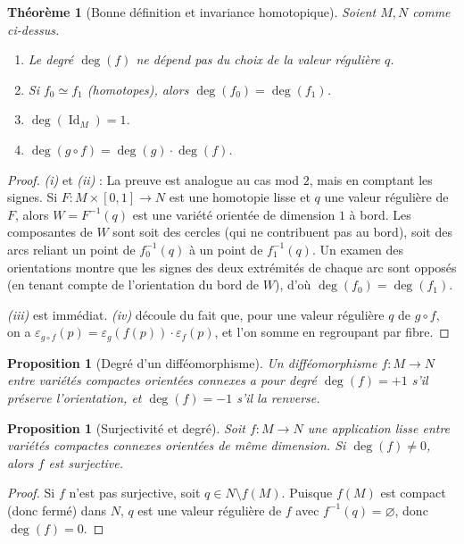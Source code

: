 \documentclass[12pt,a4paper,openany]{book}
\theoremstyle{definition}
\theoremstyle{plain}
\newtheorem{theoreme}[definition]{Théorème}
\newtheorem{proposition}[definition]{Proposition}
\theoremstyle{remark}
\DeclareMathOperator{\Id}{Id}
\begin{document}
\begin{theoreme}[Bonne définition et invariance homotopique]\label{thm:degre-oriente-bdef}
Soient $M, N$ comme ci-dessus.
\begin{enumerate}[label=(\roman*)]
  \item Le degré $\deg(f)$ ne dépend pas du choix de la valeur régulière $q$.
  \item Si $f_0 \simeq f_1$ (homotopes), alors $\deg(f_0) = \deg(f_1)$.
  \item $\deg(\Id_M) = 1$.
  \item $\deg(g \circ f) = \deg(g) \cdot \deg(f)$.
\end{enumerate}
\end{theoreme}

\begin{proof}
\textit{(i)} et \textit{(ii)} : La preuve est analogue au cas mod $2$, mais en
comptant les signes. Si $F : M \times [0,1] \to N$ est une homotopie lisse et
$q$ une valeur régulière de $F$, alors $W = F^{-1}(q)$ est une variété orientée
de dimension $1$ à bord. Les composantes de $W$ sont soit des cercles (qui ne
contribuent pas au bord), soit des arcs reliant un point de $f_0^{-1}(q)$ à un
point de $f_1^{-1}(q)$. Un examen des orientations montre que les signes des
deux extrémités de chaque arc sont opposés (en tenant compte de l'orientation du
bord de $W$), d'où $\deg(f_0) = \deg(f_1)$.

\textit{(iii)} est immédiat. \textit{(iv)} découle du fait que, pour une valeur
régulière $q$ de $g \circ f$, on a
$\varepsilon_{g \circ f}(p) = \varepsilon_g(f(p)) \cdot \varepsilon_f(p)$, et
l'on somme en regroupant par fibre.
\end{proof}

\begin{proposition}[Degré d'un difféomorphisme]\label{prop:degre-diffeo}
Un difféomorphisme $f : M \to N$ entre variétés compactes orientées connexes a
pour degré $\deg(f) = +1$ s'il préserve l'orientation, et $\deg(f) = -1$ s'il
la renverse.
\end{proposition}

\begin{proposition}[Surjectivité et degré]\label{prop:degre-surjectif}
Soit $f : M \to N$ une application lisse entre variétés compactes connexes
orientées de même dimension. Si $\deg(f) \neq 0$, alors $f$ est surjective.
\end{proposition}

\begin{proof}
Si $f$ n'est pas surjective, soit $q \in N \setminus f(M)$. Puisque $f(M)$ est
compact (donc fermé) dans $N$, $q$ est une valeur régulière de $f$ avec
$f^{-1}(q) = \varnothing$, donc $\deg(f) = 0$.
\end{proof}
\end{document}
